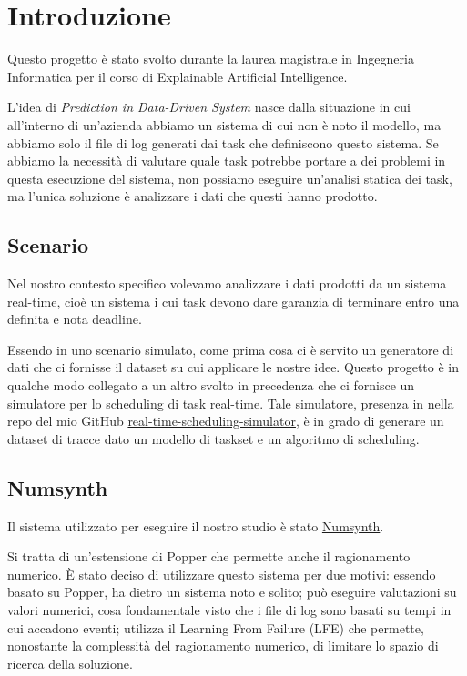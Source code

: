 \chapter{Introduzione}
Questo progetto è stato svolto durante la laurea magistrale in Ingegneria Informatica per il corso di Explainable Artificial Intelligence.

L'idea di \textit{Prediction in Data-Driven System} nasce dalla situazione in cui all'interno di un'azienda abbiamo un sistema di cui non è noto il modello, ma abbiamo solo il file di log generati dai task che definiscono questo sistema. Se abbiamo la necessità di valutare quale task potrebbe portare a dei problemi in questa esecuzione del sistema, non possiamo eseguire un'analisi statica dei task, ma l'unica soluzione è analizzare i dati che questi hanno prodotto.

\section{Scenario}
Nel nostro contesto specifico volevamo analizzare i dati prodotti da un sistema real-time, cioè un sistema i cui task devono dare garanzia di terminare entro una definita e nota deadline.

Essendo in uno scenario simulato, come prima cosa ci è servito un generatore di dati che ci fornisse il dataset su cui applicare le nostre idee. Questo progetto è in qualche modo collegato a un altro svolto in precedenza che ci fornisce un simulatore per lo scheduling di task real-time. Tale simulatore, presenza in nella repo del mio GitHub \href{https://github.com/edoardosarri24/real-time-scheduling-simulator}{real-time-scheduling-simulator}, è in grado di generare un dataset di tracce dato un modello di taskset e un algoritmo di scheduling.

\section{Numsynth}
\label{sec:numsynth}
Il sistema utilizzato per eseguire il nostro studio è stato \href{https://github.com/celinehocquette/numsynth-aaai23}{Numsynth}.

Si tratta di un'estensione di Popper che permette anche il ragionamento numerico. È stato deciso di utilizzare questo sistema per due motivi: essendo basato su Popper, ha dietro un sistema noto e solito; può eseguire valutazioni su valori numerici, cosa fondamentale visto che i file di log sono basati su tempi in cui accadono eventi; utilizza il Learning From Failure (LFE) che permette, nonostante la complessità del ragionamento numerico, di limitare lo spazio di ricerca della soluzione.

